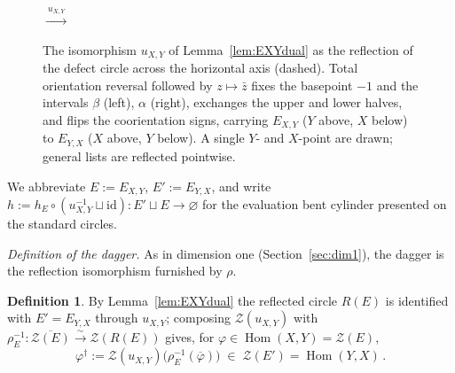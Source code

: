 \documentclass[11pt]{article}
\theoremstyle{definition}
\newtheorem{definition}[theorem]{Definition}
\newcommand{\cZ}{\mathcal{Z}}
\newcommand{\dg}{\dagger}
\begin{document}
\begin{figure}[ht]
\centering
{}
\qquad $\xrightarrow{\ u_{X,Y}\ }$ \qquad
{}
\caption{The isomorphism $u_{X,Y}$ of Lemma~\ref{lem:EXYdual} as the reflection of the defect circle across the horizontal axis (dashed). Total orientation reversal followed by $z \mapsto \bar z$ fixes the basepoint $-1$ and the intervals $\beta$ (left), $\alpha$ (right), exchanges the upper and lower halves, and flips the coorientation signs, carrying $E_{X,Y}$ ($Y$ above, $X$ below) to $E_{Y,X}$ ($X$ above, $Y$ below). A single $Y$- and $X$-point are drawn; general lists are reflected pointwise.}
\label{fig:reflectEXY}
\end{figure}

We abbreviate $E := E_{X,Y}$, $E' := E_{Y,X}$, and write $h := h_{E} \circ (u_{X,Y}^{-1} \sqcup \mathrm{id}) \colon E' \sqcup E \to \varnothing$ for the evaluation bent cylinder presented on the standard circles.

\emph{Definition of the dagger.} As in dimension one (Section~\ref{sec:dim1}), the dagger is the reflection isomorphism furnished by $\rho$.

\begin{definition}
\label{def:daggeronTZ}
By Lemma~\ref{lem:EXYdual} the reflected circle $R(E)$ is identified with $E' = E_{Y,X}$ through $u_{X,Y}$; composing $\cZ(u_{X,Y})$ with $\rho_E^{-1} \colon \overline{\cZ(E)} \xrightarrow{\ \sim\ } \cZ(R(E))$ gives, for $\varphi \in \operatorname{Hom}(X,Y) = \cZ(E)$,
\begin{equation}
\label{eq:daggerdef}
  \varphi^\dg := \cZ(u_{X,Y})\big(\rho_E^{-1}(\overline{\varphi})\big) \;\in\; \cZ(E') = \operatorname{Hom}(Y,X) \, .
\end{equation}
\end{definition}
\end{document}
